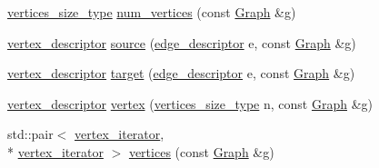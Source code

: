 \begin{DoxyCompactItemize}
\hyperlink{classGraph_ac1e19ecbf236d08dff611584e4c9403e}{vertices\-\_\-size\-\_\-type} \hyperlink{classGraph_a58495c0a2630da064db06001bbee4b83}{num\-\_\-vertices} (const \hyperlink{classGraph}{Graph} \&g)
\item 
\hyperlink{classGraph_a9b97d75f995b7c1cb0b5760690bef3ba}{vertex\-\_\-descriptor} \hyperlink{classGraph_aaf79fda6416b9938350acc8dc0e7eb3a}{source} (\hyperlink{classGraph_ab641b227e6d3e56c3340cda156fc2bad}{edge\-\_\-descriptor} e, const \hyperlink{classGraph}{Graph} \&g)
\item 
\hyperlink{classGraph_a9b97d75f995b7c1cb0b5760690bef3ba}{vertex\-\_\-descriptor} \hyperlink{classGraph_a420cbf54b789866111b8a73634657623}{target} (\hyperlink{classGraph_ab641b227e6d3e56c3340cda156fc2bad}{edge\-\_\-descriptor} e, const \hyperlink{classGraph}{Graph} \&g)
\item 
\hyperlink{classGraph_a9b97d75f995b7c1cb0b5760690bef3ba}{vertex\-\_\-descriptor} \hyperlink{classGraph_a1110c8a88b4ff021738a586020295ae2}{vertex} (\hyperlink{classGraph_ac1e19ecbf236d08dff611584e4c9403e}{vertices\-\_\-size\-\_\-type} n, const \hyperlink{classGraph}{Graph} \&g)
\item 
std\-::pair$<$ \hyperlink{classGraph_aee10ac35c0bad19ebc93f33eb08e149d}{vertex\-\_\-iterator}, \\*
\hyperlink{classGraph_aee10ac35c0bad19ebc93f33eb08e149d}{vertex\-\_\-iterator} $>$ \hyperlink{classGraph_a8af8c02507f2320f17008c3d7e7a471c}{vertices} (const \hyperlink{classGraph}{Graph} \&g)
\end{DoxyCompactItemize}


